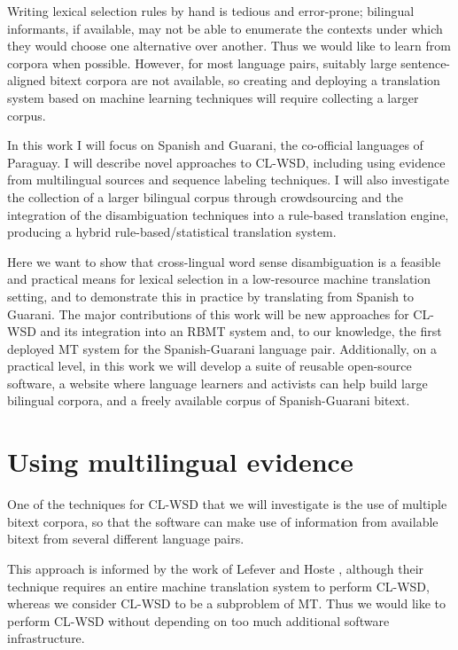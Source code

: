 \documentclass{article}
\begin{document}
Writing lexical selection rules by hand is tedious and error-prone; bilingual
informants, if available, may not be able to
enumerate the contexts under which they would choose one alternative over
another. Thus we would like to learn from corpora when possible. However, for
most language pairs, suitably large sentence-aligned bitext corpora are not
available, so creating and deploying a translation system based on machine
learning techniques will require collecting a larger corpus.

In this work I will focus on Spanish and Guarani, the co-official languages of
Paraguay.
I will describe novel approaches to CL-WSD, including using evidence from
multilingual sources and sequence labeling techniques. I will also investigate
the collection of a larger bilingual corpus through crowdsourcing and the
integration of the disambiguation techniques into a rule-based translation
engine, producing a hybrid rule-based/statistical translation system.

Here we want to show that cross-lingual word sense disambiguation is a feasible
and practical means for lexical selection in a low-resource machine translation
setting, and to demonstrate this in practice by translating from Spanish to
Guarani. The major contributions of this work will be new approaches for CL-WSD
and its integration into an RBMT system and, to our knowledge, the first
deployed MT system for the Spanish-Guarani language pair.  Additionally, on a
practical level, in this work we will develop a suite of reusable open-source
software, a website where language learners and activists can help build large
bilingual corpora, and a freely available corpus of Spanish-Guarani bitext.

\section{Using multilingual evidence}
One of the techniques for CL-WSD that we will investigate is the use of
multiple bitext corpora, so that the software can make use of information from
available bitext from several different language pairs.

This approach is informed by the work of Lefever and Hoste
\cite{lefever-hoste-decock:2011:ACL-HLT2011}, although their technique requires
an entire machine translation system to perform CL-WSD, whereas we consider
CL-WSD to be a subproblem of MT. Thus we would like to perform CL-WSD without
depending on too much additional software infrastructure.
\end{document}
